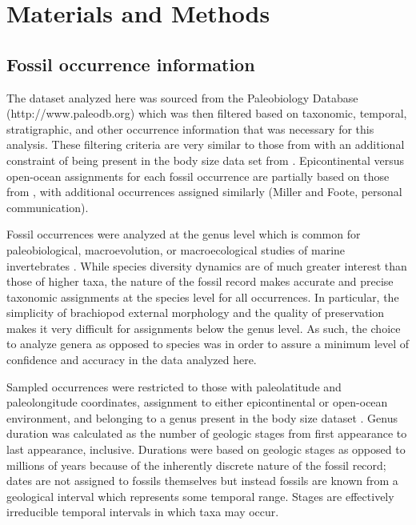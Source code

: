 \documentclass[12pt,letterpaper]{article}
\begin{document}
\section{Materials and Methods}

\subsection{Fossil occurrence information}

The dataset analyzed here was sourced from the Paleobiology Database (http://www.paleodb.org) which was then filtered based on taxonomic, temporal, stratigraphic, and other occurrence information that was necessary for this analysis. These filtering criteria are very similar to those from \citet{Foote2013} with an additional constraint of being present in the body size data set from \citet{Payne2014}. Epicontinental versus open-ocean assignments for each fossil occurrence are partially based on those from \citet{Miller2009a}, with additional occurrences assigned similarly (Miller and Foote, personal communication).

Fossil occurrences were analyzed at the genus level which is common for paleobiological, macroevolution, or macroecological studies of marine invertebrates \citep{Alroy2010,Foote2013,Harnik2013,Kiessling2007a,Miller2009a,Nurnberg2013a,Nurnberg2015,Payne2007,Simpson2009,Vilhena2013}. While species diversity dynamics are of much greater interest than those of higher taxa, the nature of the fossil record makes accurate and precise taxonomic assignments at the species level for all occurrences. In particular, the simplicity of brachiopod external morphology and the quality of preservation makes it very difficult for assignments below the genus level. As such, the choice to analyze genera as opposed to species was in order to assure a minimum level of confidence and accuracy in the data analyzed here.

Sampled occurrences were restricted to those with paleolatitude and paleolongitude coordinates, assignment to either epicontinental or open-ocean environment, and belonging to a genus present in the body size dataset \citep{Payne2014}. Genus duration was calculated as the number of geologic stages from first appearance to last appearance, inclusive. Durations were based on geologic stages as opposed to millions of years because of the inherently discrete nature of the fossil record; dates are not assigned to fossils themselves but instead fossils are known from a geological interval which represents some temporal range. Stages are effectively irreducible temporal intervals in which taxa may occur.
\end{document}
